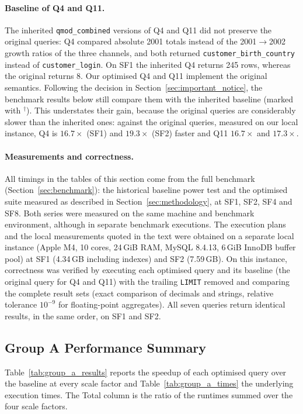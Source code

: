 \documentclass{ULBreport}
\begin{document}
\paragraph{Baseline of Q4 and Q11.} The inherited \texttt{qmod\_combined} versions of Q4 and Q11 did not preserve the original queries: Q4 compared absolute 2001 totals instead of the 2001$\rightarrow$2002 growth ratios of the three channels, and both returned \texttt{customer\_birth\_country} instead of \texttt{customer\_login}. On SF1 the inherited Q4 returns 245 rows, whereas the original returns 8. Our optimised Q4 and Q11 implement the original semantics. Following the decision in Section~\ref{sec:important_notice}, the benchmark results below still compare them with the inherited baseline (marked with $^\dagger$). This understates their gain, because the original queries are considerably slower than the inherited ones: against the original queries, measured on our local instance, Q4 is $16.7\times$ (SF1) and $19.3\times$ (SF2) faster and Q11 $16.7\times$ and $17.3\times$.

\paragraph{Measurements and correctness.} All timings in the tables of this section come from the full benchmark (Section~\ref{sec:benchmark}): the historical baseline power test and the optimised suite measured as described in Section~\ref{sec:methodology}, at SF1, SF2, SF4 and SF8. Both series were measured on the same machine and benchmark environment, although in separate benchmark executions. The execution plans and the local measurements quoted in the text were obtained on a separate local instance (Apple M4, 10 cores, 24\,GiB RAM, MySQL 8.4.13, 6\,GiB InnoDB buffer pool) at SF1 (4.34\,GB including indexes) and SF2 (7.59\,GB). On this instance, correctness was verified by executing each optimised query and its baseline (the original query for Q4 and Q11) with the trailing \texttt{LIMIT} removed and comparing the complete result sets (exact comparison of decimals and strings, relative tolerance $10^{-9}$ for floating-point aggregates). All seven queries return identical results, in the same order, on SF1 and SF2.

\subsection{Group A Performance Summary}
Table~\ref{tab:group_a_results} reports the speedup of each optimised query over the baseline at every scale factor and Table~\ref{tab:group_a_times} the underlying execution times. The Total column is the ratio of the runtimes summed over the four scale factors.
\end{document}
